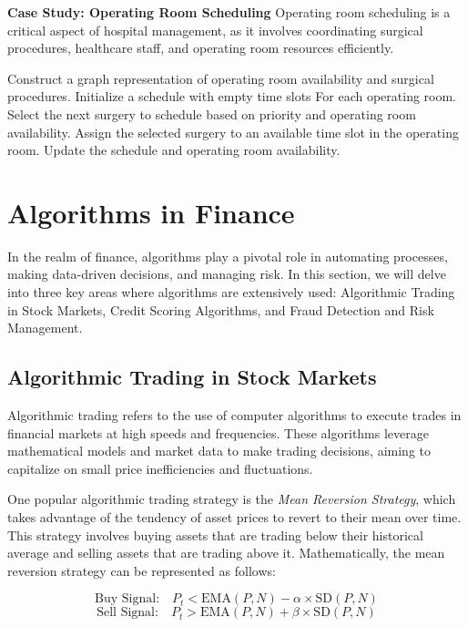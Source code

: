 \documentclass[12pt]{book} %
\begin{document}
\textbf{Case Study: Operating Room Scheduling}
Operating room scheduling is a critical aspect of hospital management, as it involves coordinating surgical procedures, healthcare staff, and operating room resources efficiently.
\FloatBarrier
\begin{algorithm}
\caption{Operating Room Scheduling Algorithm}
\begin{algorithmic}[1]
\State Construct a graph representation of operating room availability and surgical procedures.
\State Initialize a schedule with empty time slots For each operating room.
    \State Select the next surgery to schedule based on priority and operating room availability.
    \State Assign the selected surgery to an available time slot in the operating room.
    \State Update the schedule and operating room availability.
\EndWhile
\end{algorithmic}
\end{algorithm}

\section{Algorithms in Finance}
In the realm of finance, algorithms play a pivotal role in automating processes, making data-driven decisions, and managing risk. In this section, we will delve into three key areas where algorithms are extensively used: Algorithmic Trading in Stock Markets, Credit Scoring Algorithms, and Fraud Detection and Risk Management.

\subsection{Algorithmic Trading in Stock Markets}
Algorithmic trading refers to the use of computer algorithms to execute trades in financial markets at high speeds and frequencies. These algorithms leverage mathematical models and market data to make trading decisions, aiming to capitalize on small price inefficiencies and fluctuations. 

One popular algorithmic trading strategy is the \textit{Mean Reversion Strategy}, which takes advantage of the tendency of asset prices to revert to their mean over time. This strategy involves buying assets that are trading below their historical average and selling assets that are trading above it. Mathematically, the mean reversion strategy can be represented as follows:

\[
\text{Buy Signal:} \quad P_t < \text{EMA}(P, N) - \alpha \times \text{SD}(P, N)
\]
\[
\text{Sell Signal:} \quad P_t > \text{EMA}(P, N) + \beta \times \text{SD}(P, N)
\]
\end{document}
